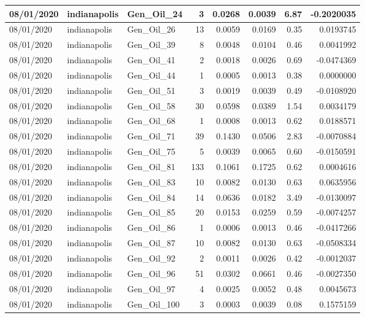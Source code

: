 \documentclass[
  letterpaper,
  DIV=11,
  numbers=noendperiod]{scrartcl}
\begin{document}
\begin{tabular}{l|l|l|r|r|r|r|r}
\hline
08/01/2020 & indianapolis & Gen\_Oil\_24 & 3 & 0.0268 & 0.0039 & 6.87 & -0.2020035\\
\hline
08/01/2020 & indianapolis & Gen\_Oil\_26 & 13 & 0.0059 & 0.0169 & 0.35 & 0.0193745\\
\hline
08/01/2020 & indianapolis & Gen\_Oil\_39 & 8 & 0.0048 & 0.0104 & 0.46 & 0.0041992\\
\hline
08/01/2020 & indianapolis & Gen\_Oil\_41 & 2 & 0.0018 & 0.0026 & 0.69 & -0.0474369\\
\hline
08/01/2020 & indianapolis & Gen\_Oil\_44 & 1 & 0.0005 & 0.0013 & 0.38 & 0.0000000\\
\hline
08/01/2020 & indianapolis & Gen\_Oil\_51 & 3 & 0.0019 & 0.0039 & 0.49 & -0.0108920\\
\hline
08/01/2020 & indianapolis & Gen\_Oil\_58 & 30 & 0.0598 & 0.0389 & 1.54 & 0.0034179\\
\hline
08/01/2020 & indianapolis & Gen\_Oil\_68 & 1 & 0.0008 & 0.0013 & 0.62 & 0.0188571\\
\hline
08/01/2020 & indianapolis & Gen\_Oil\_71 & 39 & 0.1430 & 0.0506 & 2.83 & -0.0070884\\
\hline
08/01/2020 & indianapolis & Gen\_Oil\_75 & 5 & 0.0039 & 0.0065 & 0.60 & -0.0150591\\
\hline
08/01/2020 & indianapolis & Gen\_Oil\_81 & 133 & 0.1061 & 0.1725 & 0.62 & 0.0004616\\
\hline
08/01/2020 & indianapolis & Gen\_Oil\_83 & 10 & 0.0082 & 0.0130 & 0.63 & 0.0635956\\
\hline
08/01/2020 & indianapolis & Gen\_Oil\_84 & 14 & 0.0636 & 0.0182 & 3.49 & -0.0130097\\
\hline
08/01/2020 & indianapolis & Gen\_Oil\_85 & 20 & 0.0153 & 0.0259 & 0.59 & -0.0074257\\
\hline
08/01/2020 & indianapolis & Gen\_Oil\_86 & 1 & 0.0006 & 0.0013 & 0.46 & -0.0417266\\
\hline
08/01/2020 & indianapolis & Gen\_Oil\_87 & 10 & 0.0082 & 0.0130 & 0.63 & -0.0508334\\
\hline
08/01/2020 & indianapolis & Gen\_Oil\_92 & 2 & 0.0011 & 0.0026 & 0.42 & -0.0012037\\
\hline
08/01/2020 & indianapolis & Gen\_Oil\_96 & 51 & 0.0302 & 0.0661 & 0.46 & -0.0027350\\
\hline
08/01/2020 & indianapolis & Gen\_Oil\_97 & 4 & 0.0025 & 0.0052 & 0.48 & 0.0045673\\
\hline
08/01/2020 & indianapolis & Gen\_Oil\_100 & 3 & 0.0003 & 0.0039 & 0.08 & 0.1575159\\

\end{tabular}
\end{document}
